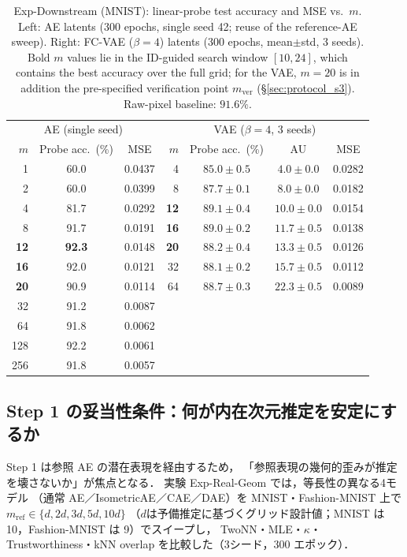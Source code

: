 \documentclass[11pt,a4paper]{jsarticle}
\newcommand{\kap}{\kappa}
\begin{document}
\begin{table}[H]
\centering
\caption{Exp-Downstream (MNIST): linear-probe test accuracy and MSE vs.\ $m$.
Left: AE latents (300 epochs, single seed 42; reuse of the reference-AE
sweep). Right: FC-VAE ($\beta = 4$) latents (300 epochs, mean$\pm$std, 3
seeds). Bold $m$ values lie in the ID-guided search window $[10, 24]$,
which contains the best accuracy over the full grid; for the VAE, $m = 20$
is in addition the pre-specified verification point $m_{\mathrm{ver}}$
(§\ref{sec:protocol_s3}).
Raw-pixel baseline: $91.6\%$.}
\label{tab:downstream}
\small
\begin{tabular}{r cc | r ccc}
\toprule
\multicolumn{3}{c|}{AE (single seed)} & \multicolumn{4}{c}{VAE ($\beta = 4$, 3 seeds)} \\
$m$ & Probe acc.\ (\%) & MSE & $m$ & Probe acc.\ (\%) & AU & MSE \\
\midrule
1 & 60.0 & 0.0437 & 4 & $85.0 \pm 0.5$ & $4.0 \pm 0.0$ & 0.0282 \\
2 & 60.0 & 0.0399 & 8 & $87.7 \pm 0.1$ & $8.0 \pm 0.0$ & 0.0182 \\
4 & 81.7 & 0.0292 & \textbf{12} & $\boldsymbol{89.1 \pm 0.4}$ & $10.0 \pm 0.0$ & 0.0154 \\
8 & 91.7 & 0.0191 & \textbf{16} & $89.0 \pm 0.2$ & $11.7 \pm 0.5$ & 0.0138 \\
\textbf{12} & \textbf{92.3} & 0.0148 & \textbf{20} & $88.2 \pm 0.4$ & $13.3 \pm 0.5$ & 0.0126 \\
\textbf{16} & 92.0 & 0.0121 & 32 & $88.1 \pm 0.2$ & $15.7 \pm 0.5$ & 0.0112 \\
\textbf{20} & 90.9 & 0.0114 & 64 & $88.7 \pm 0.3$ & $22.3 \pm 0.5$ & 0.0089 \\
32 & 91.2 & 0.0087 &  & & & \\
64 & 91.8 & 0.0062 &  & & & \\
128 & 92.2 & 0.0061 &  & & & \\
256 & 91.8 & 0.0057 &  & & & \\
\bottomrule
\end{tabular}
\end{table}

\subsection{Step 1 の妥当性条件：何が内在次元推定を安定にするか}\label{sec:exp_real_geom}

Step 1 は参照 AE の潜在表現を経由するため，
「参照表現の幾何的歪みが推定を壊さないか」が焦点となる．
実験 Exp-Real-Geom では，等長性の異なる4モデル
（通常 AE／IsometricAE\cite{kato2020rdae}／CAE\cite{rifai2011cae}／DAE\cite{alain2014dae}）を
MNIST・Fashion-MNIST 上で$m_{\mathrm{ref}} \in \{d, 2d, 3d, 5d, 10d\}$
（$d$は予備推定に基づくグリッド設計値；MNIST は 10，Fashion-MNIST は 9）でスイープし，
TwoNN・MLE・$\kap$・Trustworthiness・kNN overlap を比較した（3シード，300 エポック）．
\end{document}
